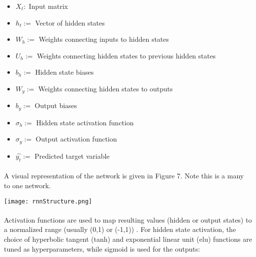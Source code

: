 \documentclass[11pt]{article}
\newenvironment{Figure}
  {\par\medskip\noindent\minipage{\linewidth}}
  {\endminipage\par\medskip}
\begin{document}
            \begin{multicols*}{2}

                    \begin{itemize}
                        \item $X_t: $ Input matrix 
                        \item $h_t := $ Vector of hidden states
                        \item $W_h := $ Weights connecting inputs to hidden states
                        \item $U_h := $ Weights connecting hidden states to previous hidden states
                        \item $b_h := $ Hidden state biases
                        \item $W_y := $ Weights connecting hidden states to outputs
                        \item $b_y := $ Output biases
                        \item $\sigma_h := $ Hidden state activation function
                        \item $\sigma_y := $ Output activation function
                        \item $\hat{y_t} := $ Predicted target variable
                    \end{itemize}

                \paragraph{}
                    A visual representation of the network is given in Figure 7. 
                    Note this is a many to one network. 

                \begin{Figure}  
                    \centering
                    \texttt{[image: rnnStructure.png]}
                    \label{fig:Basic RNN Topolgy}
                \end{Figure}

                \vspace{-5pt}

                \paragraph{}
                    Activation functions are used to map resulting values (hidden or output states) to a normalized range (usually (0,1) or (-1,1)) \cite{Murilo22}.
                    For hidden state activation, the choice of hyperbolic tangent (tanh) and exponential linear unit (elu) functions are tuned as hyperparameters, while sigmoid is used for the outputs:
                    

\end{multicols*}
\end{document}
